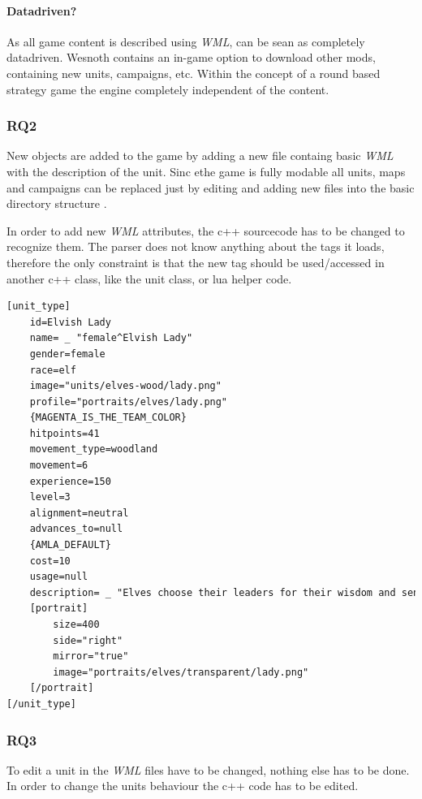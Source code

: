 \paragraph{Datadriven?}
As all game content is described using \textit{WML}, \BOW{} can be sean as completely datadriven. Wesnoth contains an in-game option
to download other mods, containing new units, campaigns, etc. Within the concept of a round based strategy game the
engine completely independent of the content.

\subsubsection{RQ2}
New objects are added to the game by adding a new file containg basic \textit{WML} with the description of the unit.
Sinc ethe game is fully modable all units, maps and campaigns can be replaced just by editing and adding new files into
the basic directory structure \cite{wesnothaddunit}.

In order to add new \textit{WML} attributes, the c++ sourcecode has to be changed to recognize them. The \BOW{} parser
does not know anything about the tags it loads, therefore the only constraint is that the new tag should be used/accessed
in another c++ class, like the unit class, or lua helper code.

\begin{lstlisting}[language=XML,caption=A basic (shortened) \BOW{} unit definition in WML, label=wesnothwml]
[unit_type]
    id=Elvish Lady
    name= _ "female^Elvish Lady"
    gender=female
    race=elf
    image="units/elves-wood/lady.png"
    profile="portraits/elves/lady.png"
    {MAGENTA_IS_THE_TEAM_COLOR}
    hitpoints=41
    movement_type=woodland
    movement=6
    experience=150
    level=3
    alignment=neutral
    advances_to=null
    {AMLA_DEFAULT}
    cost=10
    usage=null
    description= _ "Elves choose their leaders for their wisdom and sensitivity to the balance of universal forces; foresight is what has protected them in times of uncertainty. Their just reign is rewarded by the unflagging fealty of their people, which is the greatest gift for which any ruler could ask."
    [portrait]
        size=400
        side="right"
        mirror="true"
        image="portraits/elves/transparent/lady.png"
    [/portrait]
[/unit_type]
\end{lstlisting}

\subsubsection{RQ3}
To edit a unit in \BOW{} the \textit{WML} files have to be changed, nothing else has to be done. In order to change the
units behaviour the c++ code has to be edited.

